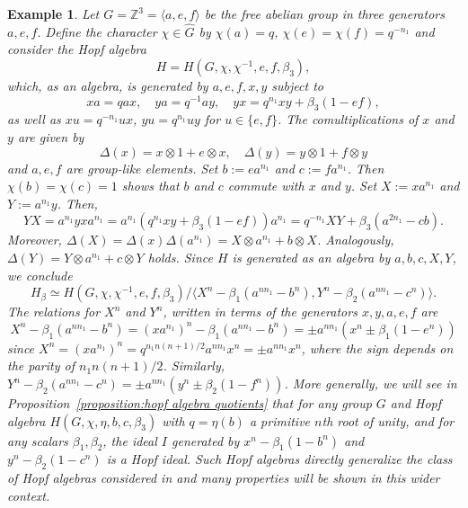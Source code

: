 \documentclass[11pt, twoside]{amsart}
\newtheorem{example}[theorem]{Example}
\theoremstyle{definition}
\newcommand{\ZZ}{\mathbb{Z}}
\begin{document}
\begin{example}
    Let $G = \ZZ^3 = \langle a, e, f\rangle$ be the free abelian group in three generators $a, e, f$. Define the character $\chi \in \widehat{G}$ by $\chi(a) = q$, $\chi(e) = \chi(f) = q^{-n_1}$ and consider the Hopf algebra
    \[H = H(G, \chi, \chi^{-1}, e, f, \beta_3),\]
    which, as an algebra, is generated by $a, e, f, x, y$ subject to 
    \[xa = qax,\quad ya = q^{-1}ay,\quad yx = q^{n_1}xy + \beta_3 (1 - ef),\]
    as well as $xu = q^{-n_1}ux$, $yu = q^{n_1}uy$ for $u \in \{e, f\}$. The comultiplications of $x$ and $y$ are given by 
    \[\Delta(x) = x \otimes 1 + e \otimes x,\quad \Delta(y) = y \otimes 1 + f \otimes y\]
    and $a, e, f$ are group-like elements. Set $b:= ea^{n_1}$ and $c:= fa^{n_1}$. Then $\chi(b) = \chi(c) = 1$ shows that $b$ and $c$ commute with $x$ and $y$. Set $X:= xa^{n_1}$ and $Y:= a^{n_1}y$. Then,
    \[YX = a^{n_1}yxa^{n_1} = a^{n_1}(q^{n_1}xy + \beta_3 (1 - ef))a^{n_1} = q^{-n_1}XY + \beta_3 (a^{2n_1} - cb).\]
    Moreover, $\Delta(X) = \Delta(x)\Delta(a^{n_1}) = X \otimes a^{n_1} + b \otimes X$. Analogously, $\Delta(Y) = Y \otimes a^{n_1} + c \otimes Y$ holds. Since $H$ is generated as an algebra by $a, b, c, X, Y$, we conclude 
    \[H_\beta \simeq H(G, \chi, \chi^{-1}, e, f, \beta_3)/\langle X^n - \beta_1 (a^{nn_1} - b^n), Y^n - \beta_2 (a^{nn_1} - c^n) \rangle.\]
    The relations for $X^n$ and $Y^n$, written in terms of the generators $x, y, a, e, f$ are
    \[X^n - \beta_1 (a^{nn_1} - b^n) = (xa^{n_1})^n - \beta_1 (a^{nn_1} - b^n) = \pm a^{nn_1}(x^n \pm \beta_1 (1 - e^n))\]
    since $X^n = (xa^{n_1})^n = q^{n_1 n(n+1)/2}a^{nn_1}x^n = \pm a^{nn_1}x^n$, where the sign depends on the parity of $n_1 n(n + 1)/2$. Similarly, $Y^n - \beta_2 (a^{nn_1} - c^n) = \pm a^{nn_1}(y^n \pm \beta_2 (1 - f^n))$. More generally, we will see in Proposition~\ref{proposition:hopf algebra quotients} that for any group $G$ and Hopf algebra $H(G, \chi, \eta, b, c, \beta_3)$ with $q = \eta(b)$ a primitive $n$th root of unity, and for any scalars $\beta_1, \beta_2$, the ideal $I$ generated by $x^n - \beta_1 (1 - b^n)$ and $y^n - \beta_2 (1 - c^n)$ is a Hopf ideal. Such Hopf algebras directly generalize the class of Hopf algebras considered in \cite{Wang-Wu-Tan} and many properties will be shown in this wider context.
\end{example}
\end{document}
